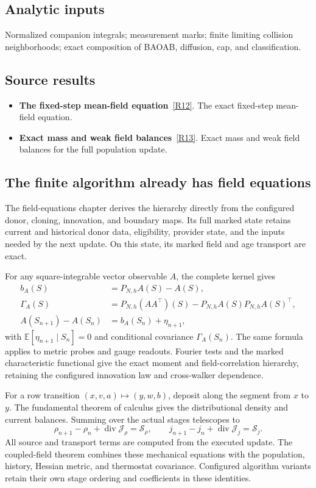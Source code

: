 \documentclass[11pt,a4paper]{article}
\begin{document}
\subsection*{Analytic inputs}
Normalized companion integrals; measurement marks; finite limiting collision neighborhoods; exact composition of BAOAB, diffusion, cap, and classification.
\subsection*{Source results}
\begin{itemize}
\item \textbf{The fixed-step mean-field equation}~\hyperref[src:thm-mean-field-equation]{[R12]}. The exact fixed-step mean-field equation.
\item \textbf{Exact mass and weak field balances}~\hyperref[src:thm-mass-conservation]{[R13]}. Exact mass and weak field balances for the full population update.
\end{itemize}
\subsection*{The finite algorithm already has field equations}
The field-equations chapter derives the hierarchy directly from the configured donor, cloning, innovation, and boundary maps. Its full marked state retains current and historical donor data, eligibility, provider state, and the inputs needed by the next update. On this state, its marked field and age transport are exact.

For any square-integrable vector observable \(A\), the complete kernel gives
\begin{align*}
b_A(S)&=P_{N,h}A(S)-A(S),\\
\Gamma_A(S)&=P_{N,h}(AA^\top)(S)-P_{N,h}A(S)P_{N,h}A(S)^\top,\\
A(S_{n+1})-A(S_n)&=b_A(S_n)+\eta_{n+1},
\end{align*}
with \(\mathbb E[\eta_{n+1}\mid S_n]=0\) and conditional covariance \(\Gamma_A(S_n)\). The same formula applies to metric probes and gauge readouts. Fourier tests and the marked characteristic functional give the exact moment and field-correlation hierarchy, retaining the configured innovation law and cross-walker dependence.

For a row transition \((x,v,a)\mapsto(y,w,b)\), deposit along the segment from \(x\) to \(y\). The fundamental theorem of calculus gives the distributional density and current balances. Summing over the actual stages telescopes to
\[
\rho_{n+1}-\rho_n+\operatorname{div}\mathcal J_\rho=\mathcal S_\rho,
\qquad
j_{n+1}-j_n+\operatorname{div}\mathcal J_j=\mathcal S_j.
\]
All source and transport terms are computed from the executed update. The coupled-field theorem combines these mechanical equations with the population, history, Hessian metric, and thermostat covariance. Configured algorithm variants retain their own stage ordering and coefficients in these identities.
\end{document}
